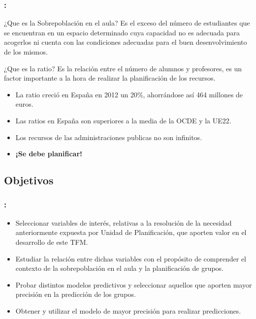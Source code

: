 \documentclass{beamer}
\begin{document}
\begin{frame}[allowframebreaks=1]
\frametitle{\secname : \subsecname}
\begin{block}{¿Que es la Sobrepoblación en el aula?}  %
Es el exceso del número de estudiantes que se encuentran en un espacio determinado cuya capacidad no es adecuada para acogerlos ni cuenta con las condiciones adecuadas para el buen desenvolvimiento de los mismos. \cite{LILIA2013}
\end{block}

\begin{block}{¿Que es la ratio?}  %
Es la relación entre el número de alumnos y profesores, es un factor importante a la hora de realizar la planificación de los recursos.
\end{block} %
\framebreak
\begin{itemize}
	\item La ratio creció en España en 2012 un 20\%, ahorrándose así 464 millones de euros.
	\item Las ratios en España son superiores a la media de la OCDE y la UE22.
	\item Los recursos de las administraciones publicas no son infinitos.
	\item \textbf{¡Se debe planificar!}
	
	
\end{itemize}
	
\end{frame}

\subsection{Objetivos}
\begin{frame}[allowframebreaks=1]
\frametitle{\secname : \subsecname}



\begin{itemize}
	\item Seleccionar variables de interés, relativas a la resolución de la necesidad anteriormente expuesta por Unidad de Planificación, que aporten valor en el desarrollo de este TFM. 
	\item Estudiar la relación entre dichas variables con el  propósito de comprender el contexto de la sobrepoblación en el aula y la planificación de grupos.
	\item Probar distintos modelos predictivos y seleccionar aquellos que aporten mayor precisión en la predicción de los grupos. 
	\item Obtener y utilizar el modelo de mayor precisión para realizar predicciones.
	
\end{itemize}
	
\end{frame}
\end{document}
